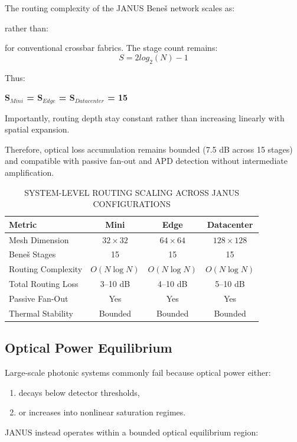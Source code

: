 \documentclass[journal]{IEEEtran}
\begin{document}
The routing complexity of the JANUS Beneš network scales as:
\begin{center}
\end{center}

rather than:
\begin{center}
\end{center}

for conventional crossbar fabrics.
The stage count remains:
\begin{equation}
S = 2 log_2(N ) - 1
\end{equation}

Thus:
\begin{center}
\textbf{S$_{Mini}$ = S$_{Edge}$ = S$_{Datacenter}$ = 15}
\end{center}

Importantly, routing depth stay constant rather than increasing linearly with spatial expansion.

Therefore, optical loss accumulation remains bounded (7.5 dB across 15 stages) and compatible with passive fan-out and APD detection without intermediate amplification.

\begin{table}[htbp]
\centering
\small
\setlength{\tabcolsep}{3pt}
\caption{SYSTEM-LEVEL ROUTING SCALING ACROSS JANUS CONFIGURATIONS}
\label{tab:table13}
\begin{tabular}{lccc}
\toprule
Metric & Mini & Edge & Datacenter \\
\midrule
Mesh Dimension & $32 \times 32$ & $64 \times 64$ & $128 \times 128$ \\
Bene\v{s} Stages & 15 & 15 & 15 \\
Routing Complexity & $O(N \log N)$ & $O(N \log N)$ & $O(N \log N)$ \\
Total Routing Loss & 3--10 dB & 4--10 dB & 5--10 dB \\
Passive Fan-Out & Yes & Yes & Yes \\
Thermal Stability & Bounded & Bounded & Bounded \\
\bottomrule
\end{tabular}
\end{table}

\subsection{\textbf{Optical Power Equilibrium}}

Large-scale photonic systems commonly fail because optical power either:
\begin{enumerate}
\item decays below detector thresholds,
\item or increases into nonlinear saturation regimes.
\end{enumerate}
JANUS instead operates within a bounded optical equilibrium region:
\end{document}
